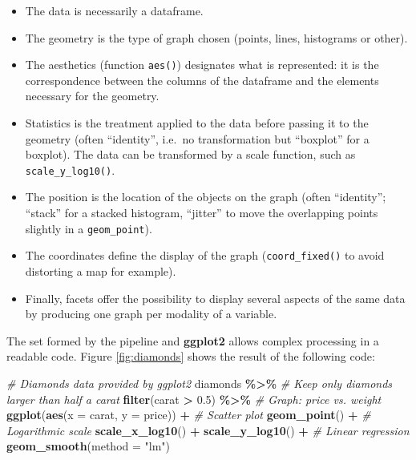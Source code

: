 \documentclass[
  12pt,
  american,
  a4paper,
  extrafontsizes,onecolumn,openright
  ]{memoir}
\newenvironment{Shaded}{\begin{snugshade}}{\end{snugshade}}
\newcommand{\AttributeTok}[1]{\textcolor[rgb]{0.13,0.29,0.53}{#1}}
\newcommand{\CommentTok}[1]{\textcolor[rgb]{0.56,0.35,0.01}{\textit{#1}}}
\newcommand{\FloatTok}[1]{\textcolor[rgb]{0.00,0.00,0.81}{#1}}
\newcommand{\FunctionTok}[1]{\textcolor[rgb]{0.13,0.29,0.53}{\textbf{#1}}}
\newcommand{\NormalTok}[1]{#1}
\newcommand{\SpecialCharTok}[1]{\textcolor[rgb]{0.81,0.36,0.00}{\textbf{#1}}}
\newcommand{\StringTok}[1]{\textcolor[rgb]{0.31,0.60,0.02}{#1}}
\providecommand{\tightlist}{%
  \setlength{\itemsep}{0pt}\setlength{\parskip}{0pt}}
\begin{document}
\begin{itemize}
\tightlist
\item
  The data is necessarily a dataframe.
\item
  The geometry is the type of graph chosen (points, lines, histograms or other).
\item
  The aesthetics (function \texttt{aes()}) designates what is represented: it is the correspondence between the columns of the dataframe and the elements necessary for the geometry.
\item
  Statistics is the treatment applied to the data before passing it to the geometry (often \enquote{identity}, i.e.~no transformation but \enquote{boxplot} for a boxplot).
  The data can be transformed by a scale function, such as \texttt{scale\_y\_log10()}.
\item
  The position is the location of the objects on the graph (often \enquote{identity}; \enquote{stack} for a stacked histogram, \enquote{jitter} to move the overlapping points slightly in a \texttt{geom\_point}).
\item
  The coordinates define the display of the graph (\texttt{coord\_fixed()} to avoid distorting a map for example).
\item
  Finally, facets offer the possibility to display several aspects of the same data by producing one graph per modality of a variable.
\end{itemize}

The set formed by the pipeline and \textbf{ggplot2} allows complex processing in a readable code.
Figure \ref{fig:diamonds} shows the result of the following code:



\scriptsize

\begin{Shaded}
\begin{Highlighting}[]
\CommentTok{\# Diamonds data provided by ggplot2}
\NormalTok{diamonds }\SpecialCharTok{\%\textgreater{}\%} 
  \CommentTok{\# Keep only diamonds larger than half a carat}
  \FunctionTok{filter}\NormalTok{(carat }\SpecialCharTok{\textgreater{}} \FloatTok{0.5}\NormalTok{) }\SpecialCharTok{\%\textgreater{}\%} 
  \CommentTok{\# Graph: price vs. weight}
  \FunctionTok{ggplot}\NormalTok{(}\FunctionTok{aes}\NormalTok{(}\AttributeTok{x =}\NormalTok{ carat, }\AttributeTok{y =}\NormalTok{ price)) }\SpecialCharTok{+}
    \CommentTok{\# Scatter plot}
    \FunctionTok{geom\_point}\NormalTok{() }\SpecialCharTok{+} 
    \CommentTok{\# Logarithmic scale}
    \FunctionTok{scale\_x\_log10}\NormalTok{() }\SpecialCharTok{+} 
    \FunctionTok{scale\_y\_log10}\NormalTok{() }\SpecialCharTok{+} 
    \CommentTok{\# Linear regression}
    \FunctionTok{geom\_smooth}\NormalTok{(}\AttributeTok{method =} \StringTok{"lm"}\NormalTok{)}
\end{Highlighting}
\end{Shaded}
\end{document}
